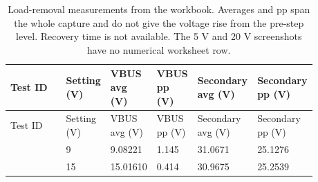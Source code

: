 \begingroup
\scriptsize
\setlength{\tabcolsep}{3pt}
\renewcommand{\arraystretch}{1.12}
\begin{longtable}{@{}L{0.2694\linewidth} L{0.0898\linewidth} L{0.1257\linewidth} L{0.1257\linewidth} L{0.1347\linewidth} L{0.1347\linewidth}@{}}
\caption{Load-removal measurements from the workbook. Averages and pp span the whole capture and do not give the voltage rise from the pre-step level. Recovery time is not available. The 5 V and 20 V screenshots have no numerical worksheet row.}\label{tab:appendix-transient-complete}\\
\toprule
Test ID & Setting (V) & VBUS avg (V) & VBUS pp (V) & Secondary avg (V) & Secondary pp (V)\\
\midrule
\endfirsthead
\toprule
Test ID & Setting (V) & VBUS avg (V) & VBUS pp (V) & Secondary avg (V) & Secondary pp (V)\\
\midrule
\endhead
{} & 9 & 9.08221 & 1.145 & 31.0671 & 25.1276\\
 & 15 & 15.01610 & 0.414 & 30.9675 & 25.2539\\
\bottomrule
\end{longtable}
\endgroup
